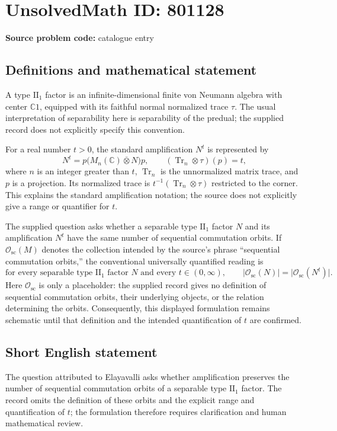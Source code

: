 \documentclass[11pt]{article}
\newcommand{\C}{\mathbb{C}}
\begin{document}
\section*{UnsolvedMath ID: 801128}
\textbf{Source problem code:} catalogue entry
\subsection{Definitions and mathematical statement}
A type \(\mathrm{II}_1\) factor is an infinite-dimensional finite von Neumann algebra with center \(\C 1\), equipped with its faithful normal normalized trace \(\tau\). The usual interpretation of separability here is separability of the predual; the supplied record does not explicitly specify this convention.

For a real number \(t>0\), the standard amplification \(N^t\) is represented by
\[
N^t=p\bigl(M_n(\C)\mathbin{\overline\otimes}N\bigr)p,
\qquad (\operatorname{Tr}_n\otimes\tau)(p)=t,
\]
where \(n\) is an integer greater than \(t\), \(\operatorname{Tr}_n\) is the unnormalized matrix trace, and \(p\) is a projection. Its normalized trace is \(t^{-1}(\operatorname{Tr}_n\otimes\tau)\) restricted to the corner. This explains the standard amplification notation; the source does not explicitly give a range or quantifier for \(t\).

The supplied question asks whether a separable type \(\mathrm{II}_1\) factor \(N\) and its amplification \(N^t\) have the same number of sequential commutation orbits. If \(\mathcal O_{\mathrm{sc}}(M)\) denotes the collection intended by the source's phrase ``sequential commutation orbits,'' the conventional universally quantified reading is
\[
\text{for every separable type }\mathrm{II}_1\text{ factor }N
\text{ and every }t\in(0,\infty),\qquad
\bigl|\mathcal O_{\mathrm{sc}}(N)\bigr|
=
\bigl|\mathcal O_{\mathrm{sc}}(N^t)\bigr|.
\]
Here \(\mathcal O_{\mathrm{sc}}\) is only a placeholder: the supplied record gives no definition of sequential commutation orbits, their underlying objects, or the relation determining the orbits. Consequently, this displayed formulation remains schematic until that definition and the intended quantification of \(t\) are confirmed.
\subsection{Short English statement}
The question attributed to Elayavalli asks whether amplification preserves the number of sequential commutation orbits of a separable type \(\mathrm{II}_1\) factor. The record omits the definition of these orbits and the explicit range and quantification of \(t\); the formulation therefore requires clarification and human mathematical review.
\end{document}
